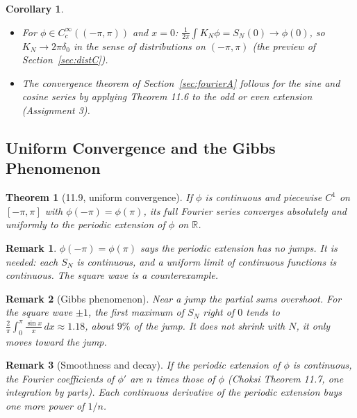 \documentclass{article}
\newtheorem{theorem}{Theorem}
\newtheorem{corollary}{Corollary}[theorem]
\newtheorem{remark}{Remark}
\newcommand{\R}{\mathbb{R}}
\begin{document}
\begin{corollary}
    \leavevmode
    \begin{itemize}
        \item For $\phi \in C_c^\infty((-\pi,\pi))$ and $x = 0$: $\frac{1}{2\pi}\int K_N\phi = S_N(0) \to \phi(0)$, so $K_N \to 2\pi\delta_0$ in the sense of distributions on $(-\pi,\pi)$ (the preview of Section~\ref{sec:distC}).
        \item The convergence theorem of Section~\ref{sec:fourierA} follows for the sine and cosine series by applying Theorem 11.6 to the odd or even extension (Assignment 3).
    \end{itemize}
\end{corollary}

\subsection{Uniform Convergence and the Gibbs Phenomenon}
\begin{theorem}[11.9, uniform convergence]
    If $\phi$ is continuous and piecewise $C^1$ on $[-\pi,\pi]$ with $\phi(-\pi) = \phi(\pi)$, its full Fourier series converges absolutely and uniformly to the periodic extension of $\phi$ on $\R$.
\end{theorem}
\begin{remark}
    $\phi(-\pi) = \phi(\pi)$ says the periodic extension has no jumps. It is needed: each $S_N$ is continuous, and a uniform limit of continuous functions is continuous. The square wave is a counterexample.
\end{remark}
\begin{remark}[Gibbs phenomenon]
    Near a jump the partial sums overshoot. For the square wave $\pm1$, the first maximum of $S_N$ right of $0$ tends to $\frac{2}{\pi}\int_0^\pi\frac{\sin x}{x}\,dx \approx 1.18$, about $9\%$ of the jump. It does not shrink with $N$, it only moves toward the jump.
\end{remark}
\begin{remark}[Smoothness and decay]
    If the periodic extension of $\phi$ is continuous, the Fourier coefficients of $\phi'$ are $n$ times those of $\phi$ (Choksi Theorem 11.7, one integration by parts). Each continuous derivative of the periodic extension buys one more power of $1/n$.
\end{remark}
\end{document}
